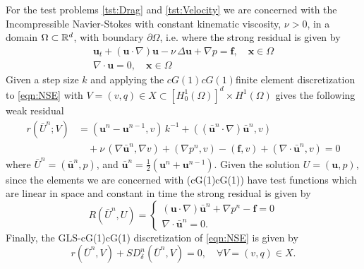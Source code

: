 For the test problems \ref{tst:Drag} and \ref{tst:Velocity} we are concerned
with the Incompressible Navier-Stokes with constant kinematic viscosity,
$\nu>0$, in a domain $\Omega\subset \mathbb{R}^d$, with boundary $\partial \Omega$, i.e.
where the strong residual is given by
\begin{equation}
    \begin{split}
      \mathbf{u}_t + \left( \mathbf{u} \cdot \nabla \right) \mathbf{u} - \nu\,
          \Delta \mathbf{u} + \nabla p = \mathbf{f}, \quad \mathbf{x} \in \Omega \\
          \nabla \cdot \mathbf{u} = 0, \quad \mathbf{x} \in \Omega
    \end{split}
  \label{eqn:NSE}
\end{equation}
Given a step size $k$ and applying the $cG(1)cG(1)$finite element discretization
to \autoref{eqn:NSE} with $V = (v, q) \in X \subset [H^1_0(\Omega)]^d \times
H^1(\Omega)$ gives the following weak residual
\begin{equation}
  \begin{split}
    r(\bar{U}^n; V) &= \left(\mathbf{u}^n - \mathbf{u}^{n-1}, v\right)\,k^{-1}
        + (\left( \bar{\mathbf{u}}^n \cdot \nabla \right) \bar{\mathbf{u}}^n, v) \\
        &\quad+ \nu\, (\nabla \bar{\mathbf{u}}^n, \nabla v)
        + (\nabla p^n, v) - (\mathbf{f}, v)
        + (\nabla \cdot \bar{\mathbf{u}}^n, v) = 0
  \end{split}
  \label{eqn:WeakNSE}
\end{equation}
where $\bar{U}^n = (\bar{\mathbf{u}}^n,p)$, and $\bar{\mathbf{u}}^n =
\frac{1}{2}\left(\mathbf{u}^n + \mathbf{u}^{n-1}\right)$. Given the solution
$U=(\mathbf{u},p)$, since the elements we are concerned with (cG(1)cG(1)) have
test functions which are linear in space and constant in time the strong
residual is given by
\begin{equation}
    R(\bar{U}^n,U) = \begin{cases}
      \left(\mathbf{u} \cdot \nabla \right) \bar{\mathbf{u}}^n
        + \nabla p^n - \mathbf{f} = 0 \\
      \nabla \cdot \bar{\mathbf{u}}^n = 0.
    \end{cases}
  \label{eqn:StrongNSE}
\end{equation}
Finally, the GLS-cG(1)cG(1) discretization of \eqref{eqn:NSE} is given by
\begin{equation}
  r(\bar{U}^n,V) + SD_{\delta}^n(\bar{U}^n,V) = 0, \quad \forall V=(v,q) \in X.
  \label{eqn:G2}
\end{equation}

